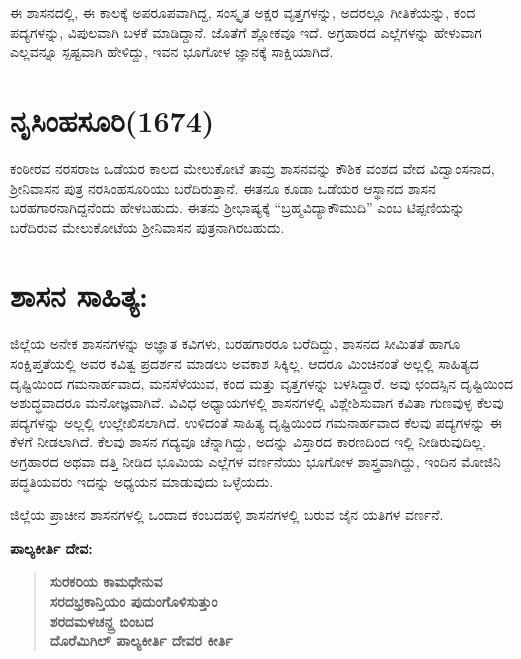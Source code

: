 ಈ ಶಾಸನದಲ್ಲಿ, ಈ ಕಾಲಕ್ಕೆ ಅಪರೂಪವಾಗಿದ್ದ, ಸಂಸ್ಕೃತ ಅಕ್ಷರ ವೃತ್ತಗಳನ್ನು, ಅದರಲ್ಲೂ ಗೀತಿಕೆಯನ್ನು, ಕಂದ ಪದ್ಯಗಳನ್ನು, ವಿಪುಲವಾಗಿ ಬಳಕೆ ಮಾಡಿದ್ದಾನೆ. ಜೊತೆಗೆ ಶ್ಲೋಕವೂ ಇದೆ. ಅಗ್ರಹಾರದ ಎಲ್ಲೆಗಳನ್ನು ಹೇಳುವಾಗ ಎಲ್ಲವನ್ನೂ ಸ್ಪಷ್ಟವಾಗಿ ಹೇಳಿದ್ದು, ಇವನ ಭೂಗೋಳ ಜ್ಞಾನಕ್ಕೆ ಸಾಕ್ಷಿಯಾಗಿದೆ.

\section*{ನೃಸಿಂಹಸೂರಿ(1674)}

ಕಂಠೀರವ ನರಸರಾಜ ಒಡೆಯರ ಕಾಲದ ಮೇಲುಕೋಟೆ ತಾಮ್ರ ಶಾಸನವನ್ನು ಕೌಶಿಕ ವಂಶದ ವೇದ ವಿದ್ವಾಂಸನಾದ, ಶ‍್ರೀನಿವಾಸನ ಪುತ್ರ ನರಸಿಂಹಸೂರಿಯು ಬರೆದಿರುತ್ತಾನೆ. ಈತನೂ ಕೂಡಾ ಒಡೆಯರ ಆಸ್ಥಾನದ ಶಾಸನ ಬರಹಗಾರನಾಗಿದ್ದ\-ನೆಂದು ಹೇಳಬಹುದು. ಈತನು ಶ‍್ರೀಭಾಷ್ಯಕ್ಕೆ “ಬ್ರಹ್ಮವಿದ್ಯಾಕೌಮುದಿ” ಎಂಬ ಟಿಪ್ಪಣಿಯನ್ನು ಬರೆದಿರುವ ಮೇಲುಕೋಟೆಯ ಶ‍್ರೀನಿವಾಸನ ಪುತ್ರನಾಗಿರಬಹುದು.

\section*{ಶಾಸನ ಸಾಹಿತ್ಯ:}

ಜಿಲ್ಲೆಯ ಅನೇಕ ಶಾಸನಗಳನ್ನು ಅಜ್ಞಾತ ಕವಿಗಳು, ಬರಹಗಾರರೂ ಬರೆದಿದ್ದು, ಶಾಸನದ ಸೀಮಿತತೆ ಹಾಗೂ ಸಂಕ್ಷಿಪ್ತತೆಯಲ್ಲಿ ಅವರ ಕವಿತ್ವ ಪ್ರದರ್ಶನ ಮಾಡಲು ಅವಕಾಶ ಸಿಕ್ಕಿಲ್ಲ. ಆದರೂ ಮಿಂಚಿನಂತೆ ಅಲ್ಲಲ್ಲಿ ಸಾಹಿತ್ಯದ ದೃಷ್ಟಿಯಿಂದ ಗಮನಾರ್ಹವಾದ, ಮನಸೆಳೆಯುವ, ಕಂದ ಮತ್ತು ವೃತ್ತಗಳನ್ನು ಬಳಸಿದ್ದಾರೆ. ಅವು ಛಂದಸ್ಸಿನ ದೃಷ್ಟಿಯಿಂದ ಅಶುದ್ಧವಾದರೂ ಮನೋಜ್ಞವಾಗಿವೆ. ವಿವಿಧ ಅಧ್ಯಾಯಗಳಲ್ಲಿ ಶಾಸನಗಳಲ್ಲಿ ವಿಶ್ಲೇಶಿಸುವಾಗ ಕವಿತಾ ಗುಣವುಳ್ಳ ಕೆಲವು ಪದ್ಯಗಳನ್ನು ಅಲ್ಲಲ್ಲಿ ಉಲ್ಲೇಖಿಸಲಾಗಿದೆ. ಉಳಿದಂತೆ ಸಾಹಿತ್ಯ ದೃಷ್ಟಿಯಿಂದ ಗಮನಾರ್ಹವಾದ ಕೆಲವು ಪದ್ಯಗಳನ್ನು ಈ ಕೆಳಗೆ ನೀಡಲಾಗಿದೆ. ಕೆಲವು ಶಾಸನ ಗದ್ಯವೂ ಚೆನ್ನಾಗಿದ್ದು, ಅದನ್ನು ವಿಸ್ತಾರದ ಕಾರಣದಿಂದ ಇಲ್ಲಿ ನೀಡಿರುವುದಿಲ್ಲ. ಅಗ್ರಹಾರದ ಅಥವಾ ದತ್ತಿ ನೀಡಿದ ಭೂಮಿಯ ಎಲ್ಲೆಗಳ ವರ್ಣನೆಯು ಭೂಗೋಳ ಶಾಸ್ತ್ರವಾಗಿದ್ದು, ಇಂದಿನ ಮೋಜಿನಿ ಪದ್ಧತಿಯವರು ಇದನ್ನು ಅಧ್ಯಯನ ಮಾಡುವುದು ಒಳ್ಳೆಯದು.

ಜಿಲ್ಲೆಯ ಪ್ರಾಚೀನ ಶಾಸನಗಳಲ್ಲಿ ಒಂದಾದ ಕಂಬದಹಳ್ಳಿ ಶಾಸನಗಳಲ್ಲಿ ಬರುವ ಜೈನ ಯತಿಗಳ ವರ್ಣನೆ.

\noindent
\textbf{ಪಾಲ್ಯಕೀರ್ತಿ ದೇವ:}

\begin{verse}
\textbf{ಸುರಕರಿಯ ಕಾಮಧೇನುವ \\ ಸರದಭ್ರಕಾನ್ತಿಯಂ ಪುದುಂಗೊಳಿಸುತ್ತುಂ \\ ಶರದಮಳಚನ್ದ್ರ ಬಿಂಬದ \\ ದೊರೆಮಿಗಿಲ್​ ಪಾಲ್ಯಕೀರ್ತಿ ದೇವರ ಕೀರ್ತಿ}
\end{verse}


